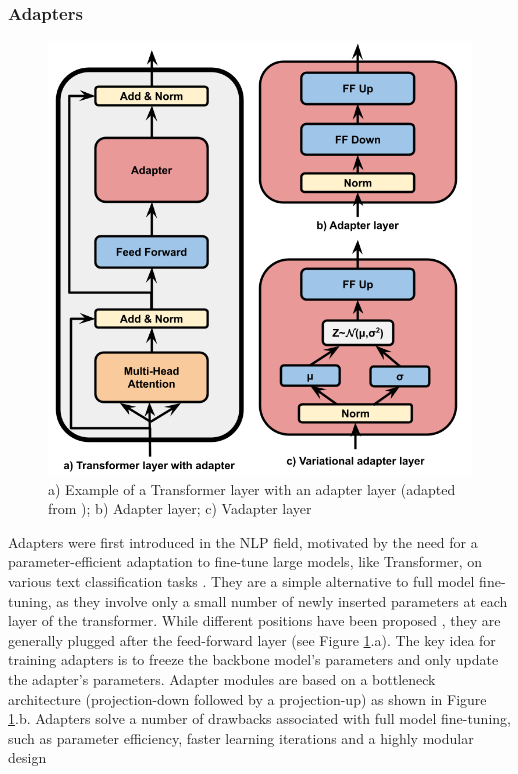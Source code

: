 \subsubsection{Adapters}
\begin{figure}[t]
\begin{center}
\includegraphics[scale=0.3]{imgs/Adapters.png}
\caption{a) Example of a Transformer layer with an adapter layer (adapted from \cite{pfeiffer}); b) Adapter layer; c) Vadapter layer}
\label{fig:all}
\end{center}
\end{figure}

Adapters were first introduced in the NLP field, motivated by the need for a parameter-efficient adaptation to fine-tune large models, like Transformer, on various text classification tasks \cite{houlsby}. They are a simple alternative to full model fine-tuning, as they involve only a small number of newly inserted parameters at each layer of the transformer.
While different positions have been proposed \cite{houlsby,pfeiffer}, they are generally plugged after the feed-forward layer (see Figure \ref{fig:all}.a). The key idea for training adapters is to freeze the backbone model's parameters and only update the adapter's parameters. Adapter modules are based on a bottleneck architecture (projection-down followed by a projection-up) as shown in Figure \ref{fig:all}.b.  Adapters solve a number of drawbacks associated with full model fine-tuning, such as parameter efficiency, faster learning iterations and a highly modular design

